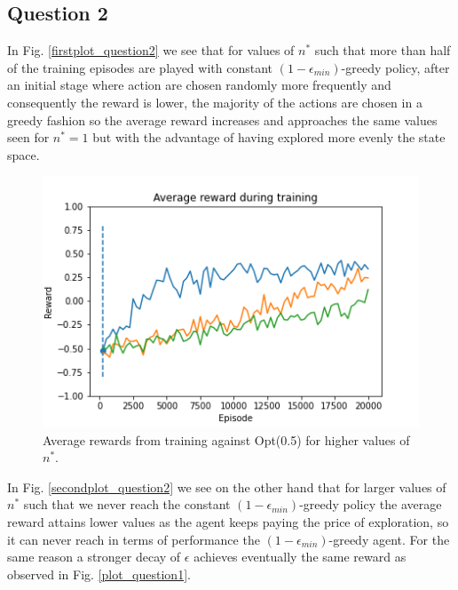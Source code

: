 \documentclass[10pt]{IEEEtran}
\begin{document}
\subsection*{Question 2}
In Fig. \eqref{firstplot_question2} we see that for values of $n^{*}$ such that more than half of the training episodes are played with constant $(1-\epsilon_{min})$-greedy policy, after an initial stage where action are chosen randomly more frequently and consequently the reward is lower, the majority of the actions are chosen in a greedy fashion so the average reward increases and approaches the same values seen for $n^{*} = 1$ but with the advantage of having explored more evenly the state space. 
\begin{figure}[H]
    \centering
    \includegraphics[scale=0.4]{code/figures/rewards_n_star_first.png}
    \caption{Average rewards from training against Opt(0.5) for higher values of $n^{*}$.}
    \label{firstplot_question2}
\end{figure}
In Fig. \eqref{secondplot_question2} we see on the other hand that for larger values of $n^{*}$ such that we never reach the constant $(1-\epsilon_{min})$-greedy policy the average reward attains lower values as the agent keeps paying the price of exploration, so it can never reach in terms of performance the $(1-\epsilon_{min})$-greedy agent. For the same reason a stronger decay of $\epsilon$ achieves eventually the same reward as observed in Fig. \eqref{plot_question1}.
\end{document}
